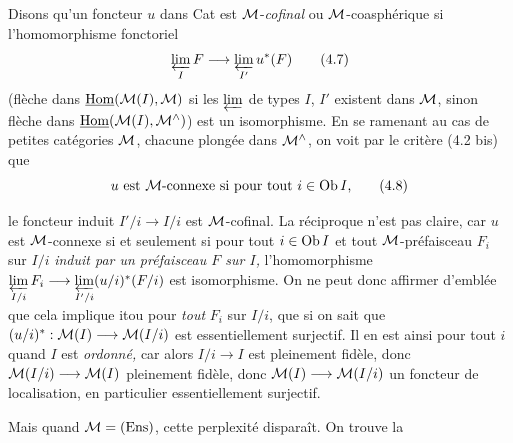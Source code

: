 Disons qu'un foncteur $u$ dans Cat est $\mathcal{M}$-\textit{cofinal} ou $\mathcal{M}$-coasphérique si l'homomorphisme fonctoriel
\[
\varprojlim_{I} F \longrightarrow \varprojlim_{I'} u^*(F)
\tag*{(4.7)}
\]
(flèche dans $\underline{\operatorname{Hom}}(\mathcal{M}(I), \mathcal{M})$ si les $\varprojlim$ de types $I$, $I'$ existent dans $\mathcal{M}$, sinon flèche dans $\underline{\operatorname{Hom}}(\mathcal{M}(I), \mathcal{M}^\wedge)$) est un isomorphisme. En se ramenant au cas de petites catégories $\mathcal{M}$, chacune plongée dans $\mathcal{M}^\wedge$, on voit par le critère (4.2 bis) que
\[
\text{$u$ est $\cM$-connexe si pour tout $i \in \Ob I$,}
\tag*{(4.8)}
\]

le foncteur induit $I'/i \longrightarrow I/i$ est $\mathcal{M}$-cofinal. La réciproque n'est pas claire, car $u$ est $\mathcal{M}$-connexe si et seulement si pour tout $i \in \operatorname{Ob} I$ et tout $\mathcal{M}$-préfaisceau $F_i$ sur $I/i$ \textit{induit par un préfaisceau $F$ sur $I$,} l'homomorphisme $\varprojlim\limits_{I/i} F_i \longrightarrow \varprojlim\limits_{I'/i} (u/i)^*(F/i)$ est isomorphisme. On ne peut donc affirmer d'emblée que cela implique itou pour \textit{tout} $F_i$ sur $I/i$, que si on sait que $(u/i)^* : \mathcal{M}(I) \longrightarrow \mathcal{M}(I/i)$ est essentiellement surjectif. Il en est ainsi pour tout $i$ quand $I$ est \textit{ordonné,} car alors $I/i \longrightarrow I$ est pleinement fidèle, donc $\mathcal{M}(I/i) \longrightarrow \mathcal{M}(I)$ pleinement fidèle, donc $\mathcal{M}(I) \longrightarrow \mathcal{M}(I/i)$ un foncteur de localisation, en particulier essentiellement surjectif.

Mais quand $\mathcal{M} = (\text{Ens})$, cette perplexité disparaît. On trouve la

